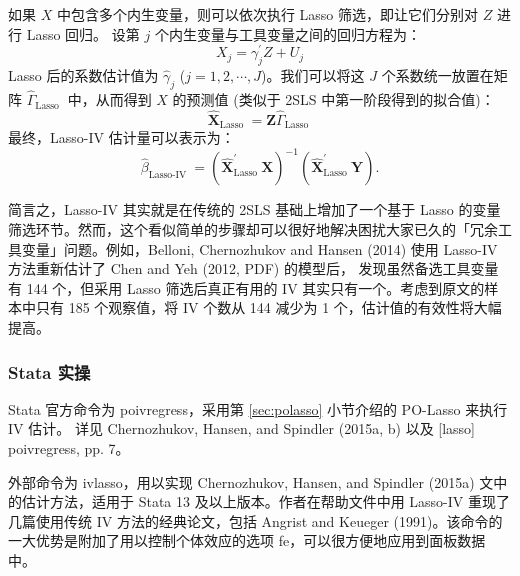{如果 $X$ 中包含多个内生变量，则可以依次执行 Lasso 筛选，即让它们分别对 $Z$ 进行 Lasso 回归。
设第 $j$ 个内生变量与工具变量之间的回归方程为：
$$X_{j}=\gamma_{j}^{\prime}Z+U_{j}$$
Lasso 后的系数估计值为 $\widehat{\gamma}_{j}$ ($j=1,2,\cdots,J$)。我们可以将这 $J$ 个系数统一放置在矩阵 $\widehat{\Gamma}_{\text {Lasso }}$ 中，从而得到 $X$ 的预测值 (类似于 2SLS 中第一阶段得到的拟合值)：
$$\widehat{\boldsymbol{X}}_{\text {Lasso }}=\boldsymbol{Z} \widehat{\Gamma}_{\text {Lasso }}$$
最终，Lasso-IV 估计量可以表示为：
$$
\widehat{\beta}_{\text {Lasso-IV }}=\left(\widehat{\boldsymbol{X}}_{\text {Lasso }}^{\prime} \boldsymbol{X}\right)^{-1}\left(\widehat{\boldsymbol{X}}_{\text {Lasso }}^{\prime} \boldsymbol{Y}\right) .
$$

简言之，Lasso-IV 其实就是在传统的 2SLS 基础上增加了一个基于 Lasso 的变量筛选环节。然而，这个看似简单的步骤却可以很好地解决困扰大家已久的「冗余工具变量」问题。例如，Belloni, Chernozhukov and Hansen (2014)
使用 Lasso-IV 方法重新估计了 Chen and Yeh (2012, PDF) 的模型后，
发现虽然备选工具变量有 144 个，但采用 Lasso 筛选后真正有用的 IV 其实只有一个。考虑到原文的样本中只有 185 个观察值，将 IV 个数从 144 减少为 1 个，估计值的有效性将大幅提高。


\subsubsection{Stata 实操}
Stata 官方命令为 poivregress，采用第 \ref{sec:polasso} 小节介绍的 PO-Lasso 来执行 IV 估计。
详见 Chernozhukov, Hansen, and Spindler (2015a, b) 以及 [lasso] poivregress, pp. 7。

外部命令为 ivlasso，用以实现  Chernozhukov, Hansen, and Spindler (2015a) 文中的估计方法，适用于 Stata 13 及以上版本。作者在帮助文件中用 Lasso-IV 重现了几篇使用传统 IV 方法的经典论文，包括 Angrist and Keueger (1991)。该命令的一大优势是附加了用以控制个体效应的选项 fe，可以很方便地应用到面板数据中。 

}

